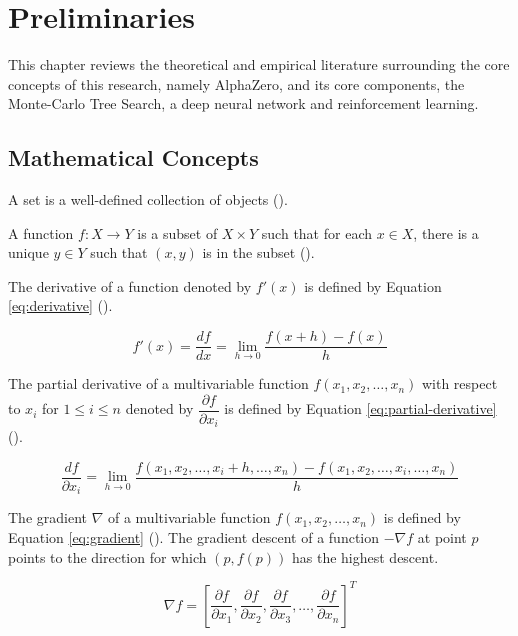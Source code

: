 \chapter{Preliminaries}

This chapter reviews the theoretical and empirical literature surrounding the core concepts of this research, namely AlphaZero, and its core components, the Monte-Carlo Tree Search, a deep neural network and reinforcement learning.

\section{Mathematical Concepts}

A set is a well-defined collection of objects (\cite{diestel2024graph}).

A function $f: X \to Y$ is a subset of $X \times Y$ such that for each $x \in X$, there is a unique $y \in Y$ such that $(x, y) $ is in the subset (\cite{thielman1953definition}).

The derivative of a function denoted by $f'(x)$ is defined by Equation \ref{eq:derivative} (\cite{kalanov2019definition}).

\begin{equation}
    f'(x) = \frac{df}{dx} = \lim_{h \to 0} \frac{f(x+h) - f(x)}{h}
    \label{eq:derivative}
\end{equation}

The partial derivative of a multivariable function $f(x_1, x_2, \ldots, x_n)$ with respect to $x_i$ for $1 \le i \le n$ denoted by $\dfrac{\partial f}{\partial x_i}$ is defined by Equation \ref{eq:partial-derivative} (\cite{widder2012advanced}).

\begin{equation}
    \frac{df}{\partial x_i} = \lim_{h \to 0} \frac{f(x_1, x_2, \ldots, x_i + h, \ldots, x_n) - f(x_1, x_2, \ldots, x_i, \ldots, x_n)}{h}
    \label{eq:partial-derivative}
\end{equation}

The gradient $\nabla$ of a multivariable function $f(x_1, x_2, \ldots, x_n)$ is defined by Equation \ref{eq:gradient} (\cite{calder2020calculus}). The gradient descent of a function $-\nabla f$ at point $p$ points to the direction for which $(p, f(p))$ has the highest descent.

\begin{equation}
    \nabla f = \left[\dfrac{\partial f}{\partial x_{1}}, \dfrac{\partial f}{\partial x_{2}}, \dfrac{\partial f}{\partial x_{3}}, \ldots, \dfrac{\partial f}{\partial x_{n}} \right]^T
    \label{eq:gradient}
\end{equation}

